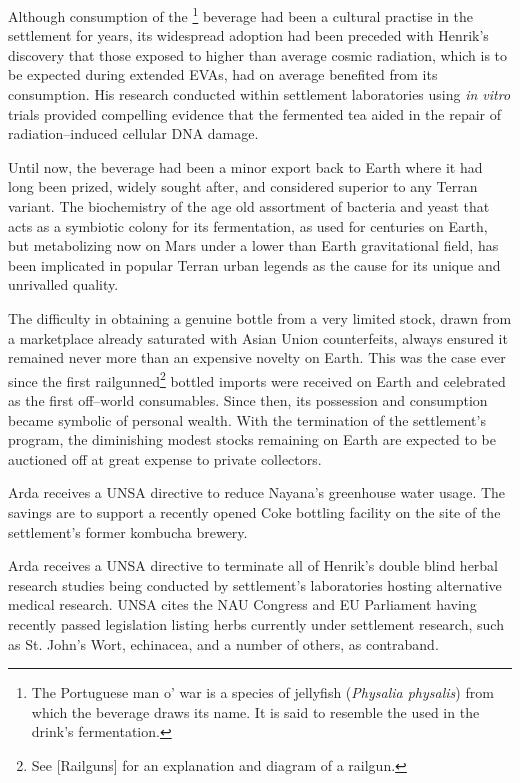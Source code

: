 Although consumption of the \footnote{The Portuguese man o' war is a species of jellyfish ({\it Physalia physalis}) from which the beverage draws its name. It is said to resemble the  used in the drink's fermentation.} beverage had been a cultural practise in the settlement for years, its widespread adoption had been preceded with Henrik's discovery that those exposed to higher than average cosmic radiation, which is to be expected during extended EVAs, had on average benefited from its consumption. His research conducted within settlement laboratories using {\it in vitro} trials provided compelling evidence that the fermented tea aided in the repair of radiation--induced cellular DNA damage. 

Until now, the beverage had been a minor export back to Earth where it had long been prized, widely sought after, and considered superior to any Terran variant. The biochemistry of the age old assortment of bacteria and yeast that acts as a symbiotic colony for its fermentation, as used for centuries on Earth, but metabolizing now on Mars under a lower than Earth gravitational field, has been implicated in popular Terran urban legends as the cause for its unique and unrivalled quality. 

The difficulty in obtaining a genuine bottle from a very limited stock, drawn from a marketplace already saturated with Asian Union counterfeits, always ensured it remained never more than an expensive novelty on Earth. This was the case ever since the first railgunned\footnote{See [Railguns] for an explanation and diagram of a railgun.} bottled imports were received on Earth and celebrated as the first off--world consumables. Since then, its possession and consumption became symbolic of personal wealth. With the termination of the settlement's program, the diminishing modest stocks remaining on Earth are expected to be auctioned off at great expense to private collectors.
\StopTimelineDate

Arda receives a UNSA directive to reduce Nayana's greenhouse water usage. The savings are to support a recently opened Coke bottling facility on the site of the settlement's former kombucha brewery.
\StopTimelineDate

Arda receives a UNSA directive to terminate all of Henrik's double blind herbal research studies being conducted by settlement's laboratories hosting alternative medical research. UNSA cites the NAU Congress and EU Parliament having recently passed legislation listing herbs currently under settlement research, such as St. John's Wort, echinacea, and a number of others, as contraband. 

